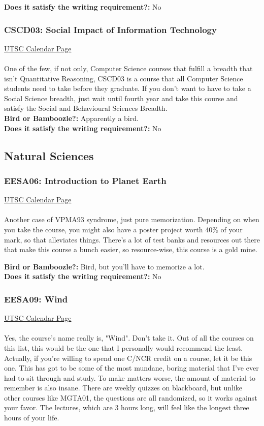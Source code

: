 \documentclass[11pt]{article}
\begin{document}
\textbf{Does it satisfy the writing requirement?:} No

\subsubsection{CSCD03: Social Impact of Information Technology}
\href{https://utsc.calendar.utoronto.ca/course/CSCD03H3}{UTSC Calendar Page}\\\\
One of the few, if not only, Computer Science courses that fulfill a breadth that isn't Quantitative Reasoning, CSCD03 is a course that all Computer Science students need to take before they graduate.  If you don't want to have to take a Social Science breadth, just wait until fourth year and take this course and satisfy the Social and Behavioural Sciences Breadth.\\

\textbf{Bird or Bamboozle?:} Apparently a bird.\\

\textbf{Does it satisfy the writing requirement?:} No

\subsection{Natural Sciences}
\subsubsection{EESA06: Introduction to Planet Earth}
\href{https://utsc.calendar.utoronto.ca/course/EESA06H3}{UTSC Calendar Page}\\\\
Another case of VPMA93 syndrome, just pure memorization.  Depending on when you take the course, you might also have a poster project worth 40$\%$ of your mark, so that alleviates things.  There's a lot of test banks and resources out there that make this course a bunch easier, so resource-wise, this course is a gold mine.

\textbf{Bird or Bamboozle?:} Bird, but you'll have to memorize a lot.\\

\textbf{Does it satisfy the writing requirement?:} No

\subsubsection{EESA09: Wind}
\href{https://utsc.calendar.utoronto.ca/course/EESA09H3}{UTSC Calendar Page}\\\\
Yes, the course's name really is, "Wind".  Don't take it.  Out of all the courses on this list, this would be the one that I personally would recommend the least.  Actually, if you're willing to spend one C/NCR credit on a course, let it be this one.  This has got to be some of the most mundane, boring material that I've ever had to sit through and study.  To make matters worse, the amount of material to remember is also insane.  There are weekly quizzes on blackboard, but unlike other courses like MGTA01, the questions are all randomized, so it works against your favor.  The lectures, which are 3 hours long, will feel like the longest three hours of your life.
\end{document}
